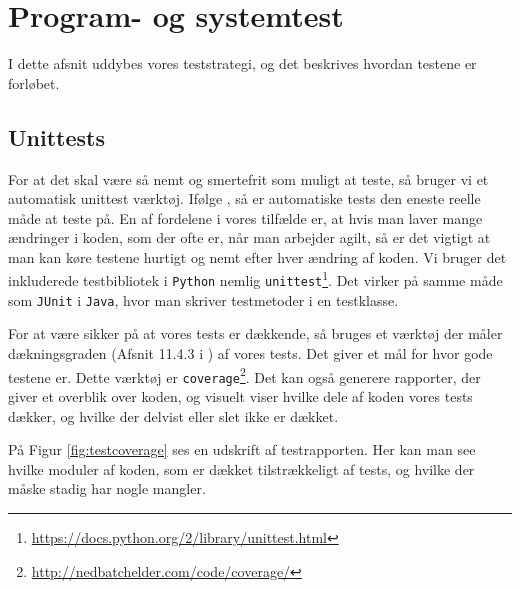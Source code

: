 \documentclass[11pt, a4paper]{article}
\begin{document}
\section{Program- og systemtest}
\label{sec:program_og_systemtest}
I dette afsnit uddybes vores teststrategi, og det beskrives hvordan testene er forløbet.

\subsection{Unittests}
\label{sub:unittests}
For at det skal være så nemt og smertefrit som muligt at teste, så bruger vi et automatisk unittest værktøj. Ifølge \cite{COCO}, så er automatiske tests den eneste reelle måde at teste på. En af fordelene i vores tilfælde er, at hvis man laver mange ændringer i koden, som der ofte er, når man arbejder agilt, så er det vigtigt at man kan køre testene hurtigt og nemt efter hver ændring af koden. Vi bruger det inkluderede testbibliotek i \verb!Python! nemlig \verb!unittest!\footnote{\url{https://docs.python.org/2/library/unittest.html}}. Det virker på samme måde som \verb!JUnit! i \verb!Java!, hvor man skriver testmetoder i en testklasse.

For at være sikker på at vores tests er dækkende, så bruges et værktøj der måler dækningsgraden (Afsnit 11.4.3 i \cite{OOSE}) af vores tests. Det giver et mål for hvor gode testene er. Dette værktøj er \verb!coverage!\footnote{\url{http://nedbatchelder.com/code/coverage/}}. Det kan også generere rapporter, der giver et overblik over koden, og visuelt viser hvilke dele af koden vores tests dækker, og hvilke der delvist eller slet ikke er dækket.

På Figur \ref{fig:testcoverage} ses en udskrift af testrapporten. Her kan man see hvilke moduler af koden, som er dækket tilstrækkeligt af tests, og hvilke der måske stadig har nogle mangler.
\end{document}
